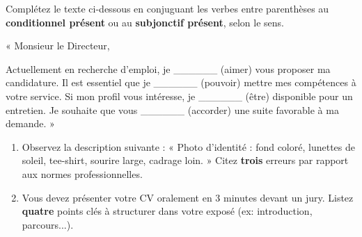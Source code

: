 \documentclass[11pt]{article}
\begin{document}
\begin{exercice}
Complétez le texte ci-dessous en conjuguant les verbes entre parenthèses au \textbf{conditionnel présent} ou au \textbf{subjonctif présent}, selon le sens.

« Monsieur le Directeur,

Actuellement en recherche d'emploi, je \_\_\_\_\_\_ (aimer) vous proposer ma candidature. Il est essentiel que je \_\_\_\_\_\_ (pouvoir) mettre mes compétences à votre service. Si mon profil vous intéresse, je \_\_\_\_\_\_ (être) disponible pour un entretien. Je souhaite que vous \_\_\_\_\_\_ (accorder) une suite favorable à ma demande. »
\end{exercice}

\begin{exercice}
\begin{enumerate}
    \item Observez la description suivante : « Photo d'identité : fond coloré, lunettes de soleil, tee-shirt, sourire large, cadrage loin. » Citez \textbf{trois} erreurs par rapport aux normes professionnelles.
    \item Vous devez présenter votre CV oralement en 3 minutes devant un jury. Listez \textbf{quatre} points clés à structurer dans votre exposé (ex: introduction, parcours...).
\end{enumerate}
\end{exercice}
\end{document}
